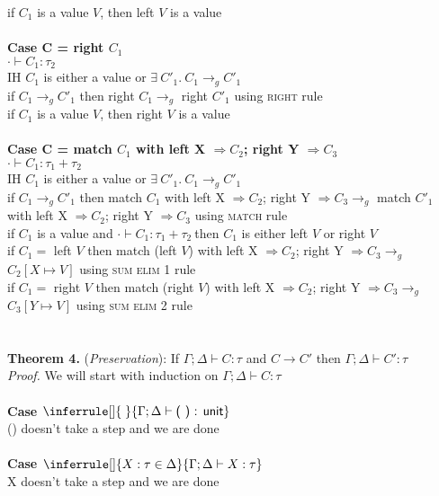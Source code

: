 \documentclass{article}
\begin{document}
if $C_1$ is a value $V$, then left $V$ is a value\\ \\
\textbf{Case C = right $C_1$} \\
$\cdot \vdash C_1: \tau_2$ \\
IH $C_1$ is either a value or $  \exists \ C'_1.\ C_1 \to_g C'_1 $ \\
if $C_1 \to_g C'_1$ then right $C_1 \to_g$ right $C'_1$ using \textsc{right} rule\\
if $C_1$ is a value $V$, then right $V$ is a value\\ \\
\textbf{Case C = match $C_1$ with left X $\Rightarrow C_2$; right Y $\Rightarrow C_3$}\\
$\cdot \vdash C_1: \tau_1 + \tau_2$\\
IH $C_1$ is either a value or $  \exists \ C'_1.\ C_1 \to_g C'_1 $ \\
if $C_1 \to_g C'_1$ then match $C_1$ with left X $\Rightarrow C_2$; right Y $\Rightarrow C_3 \to_g$ match $C'_1$ with left X $\Rightarrow C_2$; right Y $\Rightarrow C_3$ using \textsc{match} rule\\
if $C_1$ is a value and $\cdot \vdash C_1: \tau_1 + \tau_2\ $then $C_1$ is either left $V$ or right $V$\\
if $C_1 = $ left $V$ then match (left $V$) with left X $\Rightarrow C_2$; right Y $\Rightarrow C_3 \to_g$ $C_2[X \mapsto V]$ using \textsc{sum elim 1} rule\\
if $C_1 = $ right $V$ then match (right $V$) with left X $\Rightarrow C_2$; right Y $\Rightarrow C_3 \to_g$ $C_3[Y \mapsto V]$ using \textsc{sum elim 2} rule\\
\\
\\
\textbf{Theorem 4.} (\textit{Preservation}): If $\Gamma;\Delta \vdash C : \tau$ and  $C \to C'$ then $\Gamma;\Delta \vdash C' : \tau$
  \\
\textit{Proof.} We will start with induction on $\Gamma;\Delta \vdash C : \tau$ \\ \\
\textbf{Case $\inferrule []
{ \; }
{ \Gamma ; \Delta \vdash \textsf{( ) : unit} }$} \\
() doesn't take a step and we are done \\ \\
\textbf{Case $\inferrule []
{ X : \tau \in \Delta }
{ \Gamma ;\Delta \vdash X : \tau }$}       \\ 
X doesn't take a step and we are done \\ \\
\end{document}
